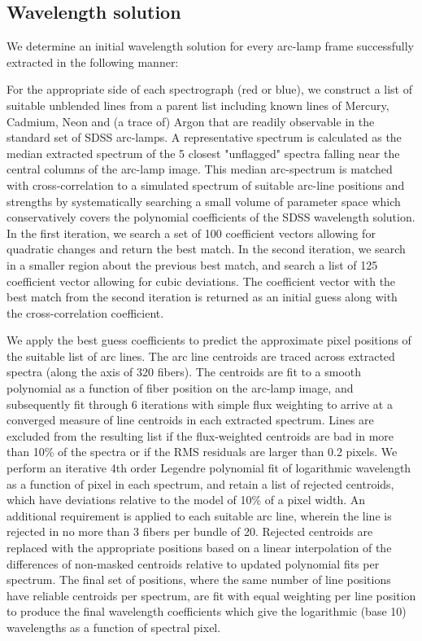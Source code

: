 \documentclass[12pt,preprint]{aastex}
\begin{document}
\subsection{Wavelength solution}

We determine an initial wavelength solution for every arc-lamp frame
successfully extracted in the following manner:

For the appropriate side of each spectrograph (red or blue), we 
construct a list of suitable unblended lines from a parent list including
known lines of Mercury, Cadmium, Neon and (a trace of) Argon 
that are readily observable in the standard set of SDSS arc-lamps. 
A representative spectrum is calculated as the median extracted spectrum
of the 5 closest "unflagged" spectra falling near the central columns 
of the arc-lamp image.  This median arc-spectrum is matched with 
cross-correlation to a simulated spectrum of suitable arc-line positions and 
strengths by systematically searching a small volume of 
parameter space which conservatively covers
the polynomial coefficients of the SDSS wavelength solution.
In the first iteration, we search a set of 
100 coefficient vectors allowing for quadratic changes and return 
the best match.  In the second iteration, we search in a smaller region
about the previous best match, and search a list of 125 coefficient vector
allowing for cubic deviations.  The coefficient vector with the best
match from the second iteration is returned as an initial guess along with
the cross-correlation coefficient.  

We apply the best guess coefficients to predict the approximate pixel 
positions of the suitable list of arc lines.  The arc line centroids
are traced across extracted spectra (along the axis of 320 fibers).
The centroids are fit to a smooth polynomial as a function of fiber
position on the arc-lamp image, and subsequently fit through 6 iterations
with simple flux weighting to arrive at a converged measure of line 
centroids in each extracted spectrum.  Lines are excluded from the resulting
list if the flux-weighted centroids are bad in more than 10\% of the
spectra or if the RMS residuals are larger than 0.2 pixels.
We perform an iterative 4th order Legendre polynomial fit of 
logarithmic wavelength as a function of pixel in each spectrum, 
and retain a list of rejected centroids, 
which have deviations relative to the model of
10\% of a pixel width.  An additional requirement is applied to each
suitable arc line, wherein the line is rejected in no more than 3 fibers
per bundle of 20.  Rejected centroids are replaced with the appropriate
positions based on a linear interpolation of the differences of non-masked
centroids relative to updated polynomial fits per spectrum.
The final set of positions, where the same number of line positions have
reliable centroids per spectrum, are fit with equal weighting per line
position to produce the final wavelength
coefficients which give the logarithmic (base 10) wavelengths as a function
of spectral pixel.
\end{document}

